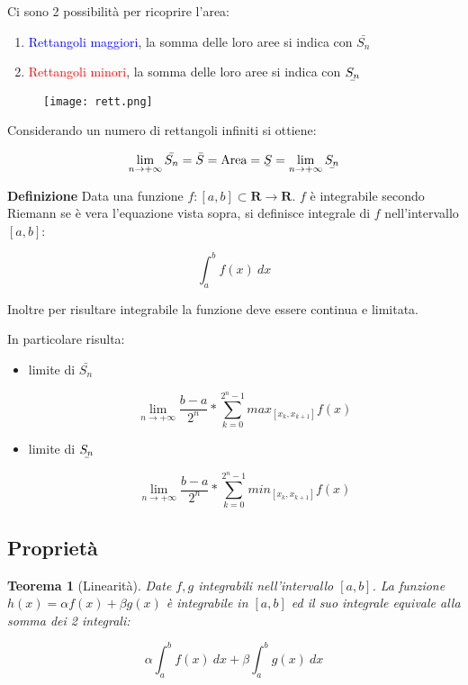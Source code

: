 \documentclass{article}
\newcommand{\ubar}[1]{\text{\b{$#1$}}}
\newtheorem{theorem}{Teorema}
\begin{document}
\noindent Ci sono 2 possibilità per ricoprire l'area:
\begin{enumerate}
    \item \textcolor{blue}{Rettangoli maggiori}, la somma delle loro aree si indica con $\bar{S_n}$
    \item \textcolor{red}{Rettangoli minori}, la somma delle loro aree si indica con $\ubar{S_n}$
\end{enumerate}

\begin{figure}[ht]
    \centering
    \texttt{[image: rett.png]}
    \label{fig:rett}
\end{figure}

\noindent Considerando un numero di rettangoli infiniti si ottiene:

$$\lim_{n\rightarrow+\infty}\bar{S_n}=\bar{S}=\text{Area}=\ubar{S}=\lim_{n\rightarrow+\infty}\ubar{S_n}$$\newline

\noindent\textbf{Definizione} Data una funzione $f:[a,b]\subset\mathbf{R}\rightarrow\mathbf{R}$. $f$ è integrabile secondo Riemann se è vera l'equazione vista sopra, si definisce integrale di $f$ nell'intervallo $[a,b]$:

$$\int_a^bf(x)\ dx$$

\noindent Inoltre per risultare integrabile la funzione deve essere continua e limitata.\newline



\noindent In particolare risulta:
\begin{itemize}
    \item limite di $\bar{S_n}$

        $$\lim_{n\rightarrow+\infty}\frac{b-a}{2^n}*\sum_{k=0}^{2^n-1}max_{[x_k,x_{k+1}]}f(x)$$

    \item limite di $\ubar{S_n}$

        $$\lim_{n\rightarrow+\infty}\frac{b-a}{2^n}*\sum_{k=0}^{2^n-1}min_{[x_k,x_{k+1}]}f(x)$$
    
\end{itemize}

\subsection{Proprietà}

\begin{theorem}[Linearità]
    Date $f,g$ integrabili nell'intervallo $[a,b]$. La funzione $h(x)=\alpha f(x)+\beta g(x)$ è integrabile in $[a,b]$ ed il suo integrale equivale alla somma dei 2 integrali:

$$\alpha\int_a^bf(x)\ dx+\beta\int_a^bg(x)\ dx$$\newline
    
\end{theorem}
\end{document}
